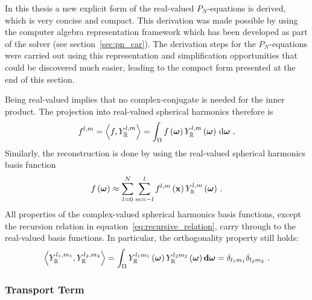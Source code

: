 In this thesis a new explicit form of the real-valued $P_N$-equations is derived, which is very concise and compact. This derivation was made possible by using the computer algebra representation framework which has been developed as part of the solver (see section~\ref{sec:pn_car}). The derivation steps for the $P_N$-equations were carried out using this representation and simplification opportunities that could be discovered much easier, leading to the compact form presented at the end of this section.

Being real-valued implies that no complex-conjugate is needed for the inner product. The projection into real-valued spherical harmonics therefore is
\begin{align}
\label{eq:sh_projection}
f^{l, m} = \left<f,Y_{\mathbb{R}}^{l, m}\right> = 
\int_\Omega f\left(\boldsymbol{\mathbf{\omega}}\right)Y_{\mathbb{R}}^{l,m}\left(\boldsymbol{\mathbf{\omega}}\right)\,\mathrm{d}\boldsymbol{\mathbf{\omega}}
\ .
\end{align}
Similarly, the reconstruction is done by using the real-valued spherical harmonics basis function
\begin{align}
f\left(\boldsymbol{\mathbf{\omega}}\right) \approx 
\sum_{l=0}^{N}
{
\sum_{m=-l}^{l}
{
f^{l,m}\left(\boldsymbol{\mathbf{x}}\right)Y_{\mathbb{R}}^{l,m}\left(\boldsymbol{\mathbf{\omega}}\right)
}
}
\ .
\label{eq:sh_real_reconstruction}
\end{align}
All properties of the complex-valued spherical harmonics basis functions, except the recursion relation in equation~\ref{eq:recursive_relation}, carry through to the real-valued basis functions. In particular, the orthogonality property still holds:
\begin{align}
\label{eq:sh_orthogonality_real}
\left<Y_{\mathbb{R}}^{l_1, m_1},Y_{\mathbb{R}}^{l_2, m_2}\right>=
\int_{\Omega} Y_{\mathbb{R}}^{l_1m_1}\left(\boldsymbol{\mathbf{\omega}}\right) Y_{\mathbb{R}}^{l_2m_2}\left(\boldsymbol{\mathbf{\omega}}\right) \mathbf{d}\boldsymbol{\mathbf{\omega}} = \delta_{l_1m_1}\delta_{l_2m_2}
\ .
\end{align}

\subsubsection*{Transport Term}

